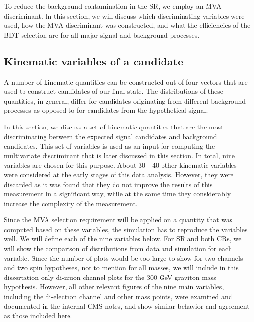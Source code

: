 To reduce the background contamination in the SR, we employ an MVA discriminant. In this section, we will discuss which discriminating variables were used, how the MVA discriminant was constructed, and what the efficiencies of the BDT selection are for all major signal and background processes. 
\label{sec:BDT}

\subsection{Kinematic variables of a candidate}
\label{sec:variables}

A number of kinematic quantities can be constructed out of four-vectors that are used to construct candidates of our final state. The distributions of these quantities, in general, differ for candidates originating from different background processes as opposed to for candidates from the hypothetical signal. 

In this section, we discuss a set of kinematic quantities that are the most discriminating between the expected signal candidates and background candidates. This set of variables is used as an input for computing the multivariate discriminant that is later discussed in this section. In total, nine variables are chosen for this purpose. About 30 - 40 other kinematic variables were considered at the early stages of this data analysis. However, they were discarded as it was found that they do not improve the results of this measurement in a significant way, while at the same time they considerably increase the complexity of the measurement.

Since the MVA selection requirement will be applied on a quantity that was computed based on these variables, the simulation has to reproduce the variables well. We will define each of the nine variables below. For SR and both CRs, we will show the comparison of distributions from data and simulation for each variable. Since the number of plots would be too large to show for two channels and two spin hypotheses, not to mention for all masses, we will include in this dissertation only di-muon channel plots for the 300 GeV graviton mass hypothesis. However, all other relevant figures of the nine main variables, including the di-electron channel and other mass points, were examined and documented in the internal CMS notes, and show similar behavior and agreement as those included here.

